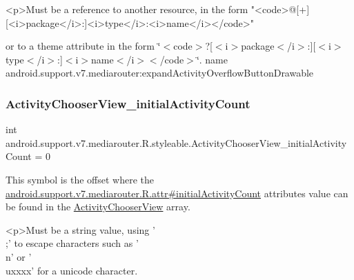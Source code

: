 \begin{DoxyVerb}      <p>Must be a reference to another resource, in the form "<code>@[+][<i>package</i>:]<i>type</i>:<i>name</i></code>"
\end{DoxyVerb}
 or to a theme attribute in the form \char`\"{}$<$code$>$?\mbox{[}$<$i$>$package$<$/i$>$\+:\mbox{]}\mbox{[}$<$i$>$type$<$/i$>$\+:\mbox{]}$<$i$>$name$<$/i$>$$<$/code$>$\char`\"{}.  name android.\+support.\+v7.\+mediarouter\+:expand\+Activity\+Overflow\+Button\+Drawable \mbox{\label{classandroid_1_1support_1_1v7_1_1mediarouter_1_1R_1_1styleable_a85994d46283b79caf8459fb6bee0dc0e}} 
\subsubsection{\texorpdfstring{Activity\+Chooser\+View\+\_\+initial\+Activity\+Count}{ActivityChooserView\_initialActivityCount}}
{\footnotesize\ttfamily int android.\+support.\+v7.\+mediarouter.\+R.\+styleable.\+Activity\+Chooser\+View\+\_\+initial\+Activity\+Count = 0\hspace{0.3cm}{\ttfamily [static]}}

This symbol is the offset where the \hyperlink{classandroid_1_1support_1_1v7_1_1mediarouter_1_1R_1_1attr_a35a8733f813298d6a8d0da9b25e258ac}{android.\+support.\+v7.\+mediarouter.\+R.\+attr\#initial\+Activity\+Count} attribute\textquotesingle{}s value can be found in the \hyperlink{classandroid_1_1support_1_1v7_1_1mediarouter_1_1R_1_1styleable_a053ff33215816ca018afd657dbf094a2}{Activity\+Chooser\+View} array.

\begin{DoxyVerb}      <p>Must be a string value, using '\\;' to escape characters such as '\\n' or '\\uxxxx' for a unicode character.
\end{DoxyVerb}
 

